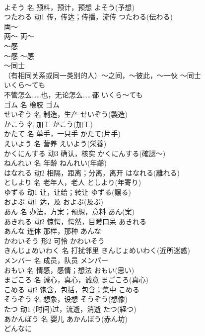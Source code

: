 \documentclass[8pt]{extreport}
\begin{document}
\begin{CJK}{UTF8}{min}
\\	よそう	名	预料，预计，预想	よそう(予想)	
\\	つたわる	动1	传，传达；传播，流传	つたわる(伝わる)	
\\	両～	
\\	两～	両～	
\\	～感	
\\	～感	～感	
\\	～同士	
\\	（有相同关系或同一类别的人）～之间，～彼此，～一伙	～同士	
\\	いくら～ても	
\\	不管怎么……也，无论怎么……都	いくら～ても	
\\	ゴム	名	橡胶	ゴム	
\\	せいぞう	名	制造，生产	せいぞう(製造)	
\\	かこう	名	加工	かこう(加工)	
\\	かたて	名	单手，一只手	かたて(片手)	
\\	えいよう	名	营养	えいよう(栄養)	
\\	かくにんする	动3	确认，核实	かくにんする(確認～)	
\\	ねんれい	名	年龄	ねんれい(年齢)	
\\	はなれる	动2	相隔，距离；分离，离开	はなれる(離れる)	
\\	としより	名	老年人，老人	としより(年寄り)	
\\	ゆずる	动1	让，让给；转让	ゆずる(譲る)	
\\	およぶ	动1	达，及	およぶ(及ぶ)	
\\	あん	名	办法，方案；预想，意料	あん(案)	
\\	あきれる	动2	惊愕，愕然，目瞪口呆	あきれる	
\\	あんな	连体	那样，那种	あんな	
\\	かわいそう	形2	可怜	かわいそう	
\\	きんじょめいわく	名	打扰邻里	きんじょめいわく(近所迷惑)	
\\	メンバー	名	成员，队员	メンバー	
\\	おもい	名	情感，感情；想法	おもい(思い)	
\\	まごころ	名	诚心，真心，诚意	まごころ(真心)	
\\	こめる	动2	饱含，包括，包含；集中	こめる	
\\	そうぞう	名	想象，设想	そうぞう(想像)	
\\	たつ	动1	(时间)过，流逝，消逝	たつ(経つ)	
\\	あかんぼう	名	婴儿	あかんぼう(赤ん坊)	
\\	どんなに	

\end{CJK}
\end{document}
